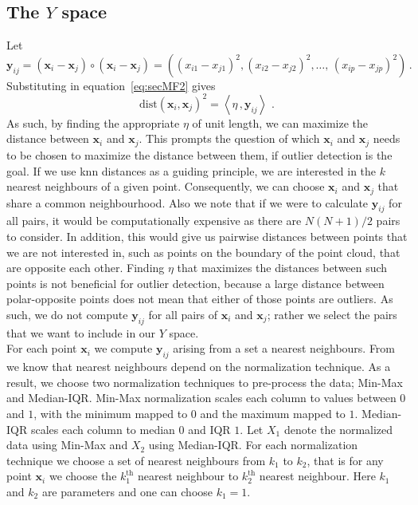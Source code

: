 \documentclass[11pt]{article}
\newcommand{\dist}{\text{dist}}
\begin{document}
\subsection{The $Y$ space}\label{sec:MathFrame1}
Let  $\bm{y}_{ij} = \left( \bm{x}_i - \bm{x}_j \right)\circ \left( \bm{x}_i - \bm{x}_j \right) = \left( \left( x_{i1} - x_{j1} \right)^2, \left( x_{i2} - x_{j2} \right)^2, \ldots,  \,  \left( x_{ip} - x_{jp} \right)^2  \right)\, . $ Substituting in equation~\eqref{eq:secMF2} gives
\begin{equation}\label{eq:secMF3}
    \dist(\bm{x}_i, \bm{x}_j)^2 = \left\langle \eta\, ,  \bm{y}_{ij} \right\rangle\, \, .
\end{equation}
As such, by finding the appropriate $\eta$ of unit length,  we can maximize the distance between $\bm{x}_i$ and $\bm{x}_j$.  This prompts the question of which $\bm{x}_i$ and $\bm{x}_j$ needs to be chosen to maximize the distance between them, if outlier detection is the goal. If we use knn distances as a guiding principle, we are interested in the $k$ nearest neighbours of a given point. Consequently, we can choose $\bm{x}_i$ and $\bm{x}_j$ that share a common neighbourhood. Also we note that if we were to calculate $\bm{y}_{ij}$ for all pairs, it would be computationally expensive as there are $N(N+1)/2$ pairs to consider. In addition, this would give us pairwise distances between points that we are not interested in, such as points on the boundary of the point cloud, that are opposite each other. Finding  $\eta$ that maximizes the distances between such points is not beneficial for outlier detection, because a large distance between polar-opposite points does not mean that either of those points are outliers. As such, we do not compute $\bm{y}_{ij}$ for all pairs of $\bm{x}_i$ and $\bm{x}_j$; rather we select the pairs that we want to include in our $Y$ space. \\

For each point $\bm{x}_i$ we compute $\bm{y}_{ij}$ arising from a set a nearest neighbours. From \cite{kandanaarachchi2018normalization} we know that nearest neighbours depend on the normalization technique. As a result, we choose two normalization techniques to pre-process the data; Min-Max and Median-IQR. Min-Max normalization scales each column to values between $0$ and $1$, with the minimum mapped to $0$ and the maximum mapped to $1$.  Median-IQR scales each column to median $0$ and IQR $1$. Let $X_1$ denote the normalized data using  Min-Max and $X_2$ using Median-IQR. For each normalization technique we choose a set of nearest neighbours from $k_1$ to $k_2$, that is for any point $\bm{x}_i$ we choose the $k_1^{\text{th}}$ nearest neighbour to  $k_2^{\text{th}}$ nearest neighbour. Here $k_1$ and $k_2$ are parameters and one can choose $k_1 =1$. \\
\end{document}
